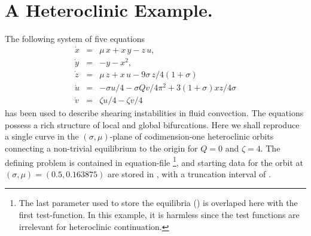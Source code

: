 \documentclass[12pt]{report}
\begin{document}
\section{ A Heteroclinic Example.}
The following system of five equations 
\begin{equation} \label{sh1} \begin{array}{rcl}
\dot{x} & = & \mu \, x + x\, y - z\, u, \\
\dot{y} & = & -y - x^2, \\
\dot{z} & = & \mu\, z + x\, u - 9\sigma\, z / 4(1+\sigma)  \\
\dot{u} & = & - \sigma u / 4 - \sigma Q v / 4\pi^2
+ 3(1 + \sigma) x z / 4\sigma \\
\dot{v} & = & \zeta u / 4  - \zeta v / 4
\end{array} 
\end{equation}
has been used to describe shearing instabilities in fluid convection.
The equations possess a rich structure of local and global bifurcations.
Here we shall reproduce a single curve in the $(\sigma,\mu)$-plane
of codimension-one heteroclinic orbits connecting a non-trivial 
equilibrium to the origin for $Q=0$ and $\zeta=4$. The defining
problem is contained in equation-file 
\footnote{The last parameter used to store the equilibria () is
overlaped here with the first test-function. In this example, it is harmless since the test functions are 
irrelevant for heteroclinic continuation.}, and starting data for the orbit at 
$(\sigma,\mu)=(0.5,0.163875)$ are stored in ,
with a truncation interval of .
\end{document}
